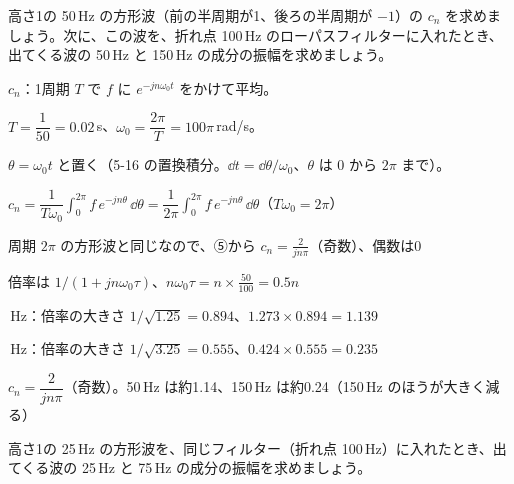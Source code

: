 \begin{reidai}[50\,Hz の方形波をローパスフィルターに通す]
高さ1の 50\,Hz の方形波（前の半周期が1、後ろの半周期が $-1$）の $c_n$ を求めましょう。次に、この波を、折れ点 100\,Hz のローパスフィルターに入れたとき、出てくる波の 50\,Hz と 150\,Hz の成分の振幅を求めましょう。\par
\kangaekata {}\par
{}\enspace $c_n$：1周期 $T$ で $f$ に $e^{-jn\omega_0t}$ をかけて平均。\par
{}\enspace $T=\dfrac{1}{50}=0.02$\,s、$\omega_0=\dfrac{2\pi}{T}=100\pi$\,rad/s。\par
{}\enspace $\theta=\omega_0t$ と置く（5-16 の置換積分。$\dd t=\dd\theta/\omega_0$、$\theta$ は $0$ から $2\pi$ まで）。\par
\shiki\kixds{}\zw{} $c_n=\dfrac{1}{T\omega_0}\displaystyle\int_0^{2\pi}f\,e^{-jn\theta}\,\dd\theta=\dfrac{1}{2\pi}\int_0^{2\pi}f\,e^{-jn\theta}\,\dd\theta$（$T\omega_0=2\pi$）\par
\kixda 周期 $2\pi$ の方形波と同じなので、⑤から $c_n=\tfrac{2}{jn\pi}$（奇数）、偶数は0\par
\kixda 倍率は $1/(1+jn\omega_0\tau)$、$n\omega_0\tau=n\times\tfrac{50}{100}=0.5n$\par
{}\,Hz：倍率の大きさ $1/\sqrt{1.25}=0.894$、$1.273\times0.894=1.139$\par
{}\,Hz：倍率の大きさ $1/\sqrt{3.25}=0.555$、$0.424\times0.555=0.235$\par
\kotae $c_n=\dfrac{2}{jn\pi}$（奇数）。50\,Hz は約1.14、150\,Hz は約0.24（150\,Hz のほうが大きく減る）
\end{reidai}

\begin{jibun}
高さ1の 25\,Hz の方形波を、同じフィルター（折れ点 100\,Hz）に入れたとき、出てくる波の 25\,Hz と 75\,Hz の成分の振幅を求めましょう。
\end{jibun}


